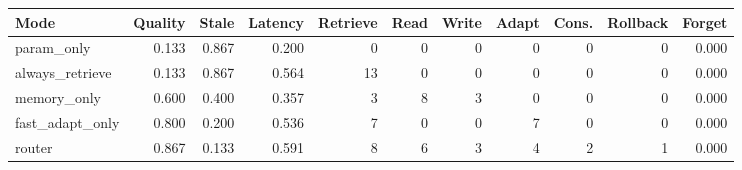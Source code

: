 \begin{tabular}{lrrrrrrrrrr}
\toprule
Mode & Quality & Stale & Latency & Retrieve & Read & Write & Adapt & Cons. & Rollback & Forget \\
\midrule
param\_only & 0.133 & 0.867 & 0.200 & 0 & 0 & 0 & 0 & 0 & 0 & 0.000 \\
always\_retrieve & 0.133 & 0.867 & 0.564 & 13 & 0 & 0 & 0 & 0 & 0 & 0.000 \\
memory\_only & 0.600 & 0.400 & 0.357 & 3 & 8 & 3 & 0 & 0 & 0 & 0.000 \\
fast\_adapt\_only & 0.800 & 0.200 & 0.536 & 7 & 0 & 0 & 7 & 0 & 0 & 0.000 \\
router & 0.867 & 0.133 & 0.591 & 8 & 6 & 3 & 4 & 2 & 1 & 0.000 \\
\bottomrule
\end{tabular}

